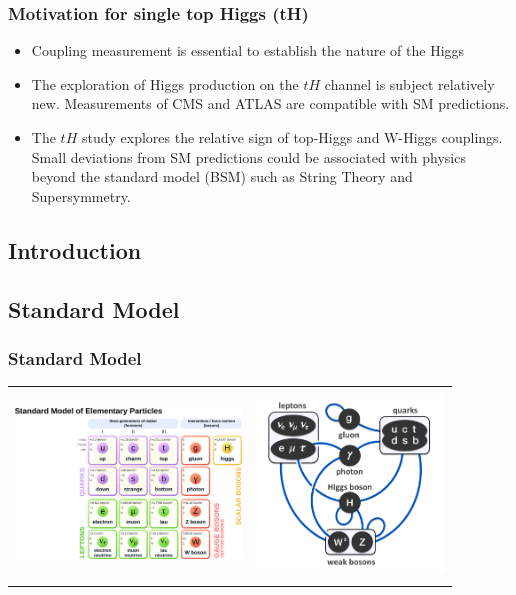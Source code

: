\documentclass[11pt]{beamer}
\begin{document}
\begin{frame}
\frametitle{Motivation  for single top Higgs (tH)}
\begin{itemize}
\item Coupling measurement is essential to establish the nature of the Higgs
\item The exploration of Higgs production on the $tH$ channel is subject relatively new. Measurements of CMS and ATLAS are compatible with SM predictions.
\item The $tH$ study explores the relative sign of top-Higgs  and W-Higgs couplings.\\ Small deviations from SM predictions could be associated with physics beyond the
standard model (BSM) such as String Theory and  Supersymmetry.
\end{itemize}
\end{frame}

\begin{frame}
\section{Introduction}
\subsection{Standard Model}
\frametitle{Standard Model}
\begin{table}
	\centering
\begin{tabular}{cc}
\includegraphics[width=6cm,height=5cm]{figures/sm1.png} & \includegraphics[width=5cm,height=5cm]{figures/sm.png}
\end{tabular}
\end{table}
\end{frame}
\end{document}
